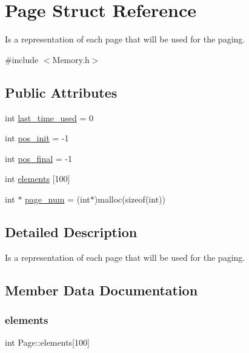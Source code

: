 \hypertarget{structPage}{}\section{Page Struct Reference}
\label{structPage}


Is a representation of each page that will be used for the paging.  




{\ttfamily \#include $<$Memory.\+h$>$}

\subsection*{Public Attributes}
\begin{DoxyCompactItemize}
\item 
int \mbox{\hyperlink{structPage_ad70f7dec34533dba242936c6ed355204}{last\+\_\+time\+\_\+used}} = 0
\item 
int \mbox{\hyperlink{structPage_a7bf30edd2a48811beb04f0d23228aefc}{pos\+\_\+init}} = -\/1
\item 
int \mbox{\hyperlink{structPage_a06b632e2575f8aad90c07ccf11fa7421}{pos\+\_\+final}} = -\/1
\item 
int \mbox{\hyperlink{structPage_a1aa3da8659749a8d44b3301037f914ec}{elements}} \mbox{[}100\mbox{]}
\item 
int $\ast$ \mbox{\hyperlink{structPage_abc4c8ba4637ce55a6488bbb25c97f049}{page\+\_\+num}} = (int$\ast$)malloc(sizeof(int))
\end{DoxyCompactItemize}


\subsection{Detailed Description}
Is a representation of each page that will be used for the paging. 

\subsection{Member Data Documentation}
\mbox{\label{structPage_a1aa3da8659749a8d44b3301037f914ec}} 
\subsubsection{\texorpdfstring{elements}{elements}}
{\footnotesize\ttfamily int Page\+::elements\mbox{[}100\mbox{]}}

